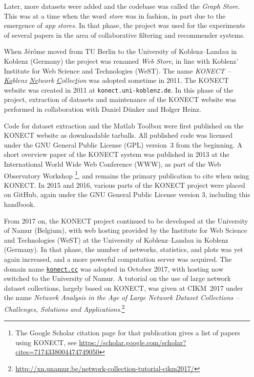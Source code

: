 \documentclass{article}
\begin{document}
Later, more datasets
were added and the codebase was called the \emph{Graph Store}.  This was
at a time when the word \emph{store} was in fashion, in part due to the
emergence of \emph{app stores}. 
In that phase, the project was used for the experiments of several papers in the area of
collaborative filtering and recommender systems.  

When Jérôme moved from
TU Berlin to the University of Koblenz--Landau in Koblenz (Germany) the
project was renamed \emph{Web Store}, in line with Koblenz' Institute
for Web Science and Technologies (WeST).  The name \emph{KONECT --
  \underline{Ko}blenz \underline{Ne}twork
  \underline{C}ollec\underline{t}ion} was adopted sometime in 2011.  The
KONECT website was created in 2011 at \texttt{konect.uni-koblenz.de}.
In this phase of the project, extraction of datasets and maintenance of the
KONECT website was performed in collaboration with Daniel Dünker and
Holger Heinz. 

Code for dataset extraction and the Matlab Toolbox were first published
on the KONECT website as downloadable tarballs.  All published code was
licensed under the GNU General Public License (GPL) version~3 from the beginning. 
A short overview paper of the KONECT system was
published in 2013 at the International World Wide Web Conference (WWW),
as part of the Web Observatory Workshop \citep{kunegis:konect}\footnote{
  The Google Scholar citation page for that publication gives a list of
  papers using KONECT, see
  \href{https://scholar.google.com/scholar?cites=7174338004474749050}{https://scholar.google.com/scholar?cites=7174338004474749050}},
and remains the primary publication to cite when using KONECT. 
In 2015 and 2016, various parts of the KONECT project were placed on
GitHub, again under the GNU
General Public License version 3, including this handbook.  

From 2017 on, the KONECT project continued to be developed at the University of
Namur (Belgium), with web hosting provided by the Institute for Web
Science and Technologies (WeST) at the University of
Koblenz--Landau in Koblenz (Germany).  In that phase, the number of
networks, statistics, and plots was yet again increased, and a more
powerful computation server was acquired.  The domain name
\href{http://konect.cc/}{\texttt{konect.cc}} was adopted in October
2017, with hosting now switched to the University of Namur. 
A tutorial on the use of large network dataset collections, largely based
on KONECT, was given at CIKM~2017 under the name \emph{Network Analysis
  in the Age of Large Network Dataset Collections -- Challenges,
  Solutions and Applications}.\footnote{\href{http://xn.unamur.be/network-collection-tutorial-cikm2017/}{http://xn.unamur.be/network-collection-tutorial-cikm2017/}}
\end{document}
